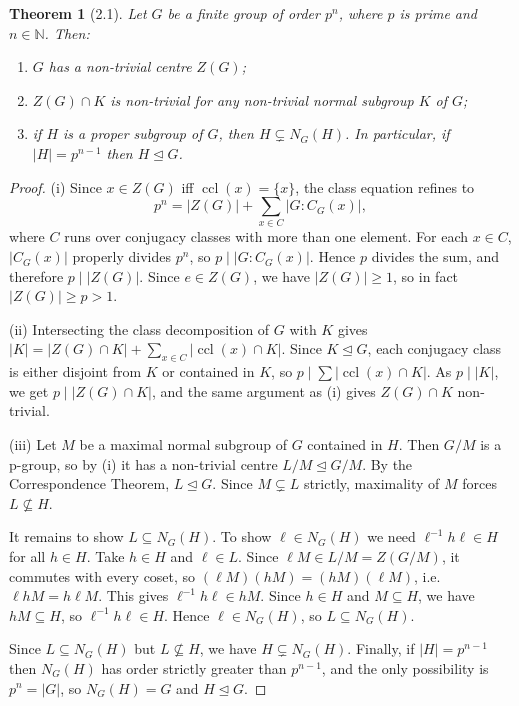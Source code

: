 \documentclass[12pt]{article}
\newtheorem{theorem}{Theorem}
\begin{document}
\begin{theorem}[2.1]
Let $G$ be a finite group of order $p^n$, where $p$ is prime and $n \in \mathbb{N}$. Then:
\begin{enumerate}[label=(\roman*)]
  \item $G$ has a non-trivial centre $Z(G)$;
  \item $Z(G) \cap K$ is non-trivial for any non-trivial normal subgroup $K$ of $G$;
  \item if $H$ is a proper subgroup of $G$, then $H \subsetneq N_G(H)$. In particular, if $|H| = p^{n-1}$ then $H \trianglelefteq G$.
\end{enumerate}
\end{theorem}

\begin{proof}
(i) Since $x \in Z(G)$ iff $\operatorname{ccl}(x) = \{x\}$, the class equation refines to
\[
  p^n = |Z(G)| + \sum_{x \in C} |G : C_G(x)|,
\]
where $C$ runs over conjugacy classes with more than one element. For each $x \in C$, $|C_G(x)|$ properly divides $p^n$, so $p \mid |G : C_G(x)|$. Hence $p$ divides the sum, and therefore $p \mid |Z(G)|$. Since $e \in Z(G)$, we have $|Z(G)| \geq 1$, so in fact $|Z(G)| \geq p > 1$.

(ii) Intersecting the class decomposition of $G$ with $K$ gives $|K| = |Z(G) \cap K| + \sum_{x \in C} |\operatorname{ccl}(x) \cap K|$. Since $K \trianglelefteq G$, each conjugacy class is either disjoint from $K$ or contained in $K$, so $p \mid \sum |\operatorname{ccl}(x) \cap K|$. As $p \mid |K|$, we get $p \mid |Z(G) \cap K|$, and the same argument as (i) gives $Z(G) \cap K$ non-trivial.

(iii) Let $M$ be a maximal normal subgroup of $G$ contained in $H$. Then $G/M$ is a p-group, so by (i) it has a non-trivial centre $L/M \trianglelefteq G/M$. By the Correspondence Theorem, $L \trianglelefteq G$. Since $M \subsetneq L$ strictly, maximality of $M$ forces $L \not\subseteq H$.

It remains to show $L \subseteq N_G(H)$. To show $\ell \in N_G(H)$ we need $\ell^{-1}h\ell \in H$ for all $h \in H$. Take $h \in H$ and $\ell \in L$. Since $\ell M \in L/M = Z(G/M)$, it commutes with every coset, so $(\ell M)(hM) = (hM)(\ell M)$, i.e.\ $\ell h M = h\ell M$. This gives $\ell^{-1}h\ell \in hM$. Since $h \in H$ and $M \subseteq H$, we have $hM \subseteq H$, so $\ell^{-1}h\ell \in H$. Hence $\ell \in N_G(H)$, so $L \subseteq N_G(H)$.

Since $L \subseteq N_G(H)$ but $L \not\subseteq H$, we have $H \subsetneq N_G(H)$. Finally, if $|H| = p^{n-1}$ then $N_G(H)$ has order strictly greater than $p^{n-1}$, and the only possibility is $p^n = |G|$, so $N_G(H) = G$ and $H \trianglelefteq G$.
\end{proof}
\end{document}
